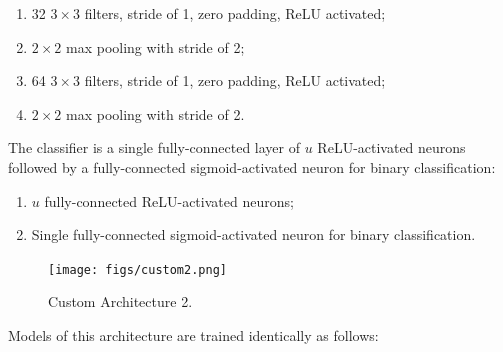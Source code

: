 \begin{enumerate}
    \item 32 $3 \times 3$ filters, stride of 1, zero padding, ReLU activated;
    \item $2 \times 2$ max pooling with stride of 2;
    \item 64 $3 \times 3$ filters, stride of 1, zero padding, ReLU activated;
    \item $2 \times 2$ max pooling with stride of 2.
\end{enumerate}

The classifier is a single fully-connected layer of $u$ ReLU-activated neurons followed by a fully-connected sigmoid-activated neuron for binary classification:

\begin{enumerate}
    \item $u$ fully-connected ReLU-activated neurons;
    \item Single fully-connected sigmoid-activated neuron for binary classification.
\end{enumerate}

\begin{figure}[ht]
    \centering
    \texttt{[image: figs/custom2.png]}
    \caption{Custom Architecture 2.}
    \label{fig:custom2}
\end{figure}

Models of this architecture are trained identically as follows:

